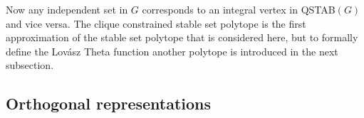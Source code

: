 %
Now any independent set in $G$ corresponds to an integral vertex in QSTAB$(G)$ and vice versa. The clique constrained stable set polytope is the first approximation of the stable set polytope that is considered here, but to formally define the Lov\'{a}sz Theta function another polytope is introduced in the next subsection.
%
%

\subsection{Orthogonal representations}\label{subsec:ONR}

